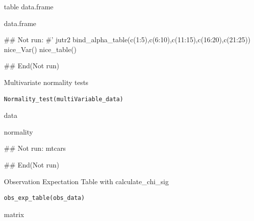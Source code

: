 \documentclass[a4paper]{book}
\begin{document}
%
\begin{Value}
table data.frame

data.frame
\end{Value}
%
\begin{Examples}
\begin{ExampleCode}

\#\# Not run: 
#'
jutr2 %
  bind_alpha_table(c(1:5),c(6:10),c(11:15),c(16:20),c(21:25))%
  nice_Var()%
  nice_table()

## End(Not run)
\end{ExampleCode}
\end{Examples}
%
\begin{Description}
Multivariate normality tests
\end{Description}
%
\begin{Usage}
\begin{verbatim}
Normality_test(multiVariable_data)
\end{verbatim}
\end{Usage}
%
\begin{Arguments}
\begin{ldescription}
\item[\code{multiVariable\_data}] data
\end{ldescription}
\end{Arguments}
%
\begin{Value}
normality
\end{Value}
%
\begin{Examples}
\begin{ExampleCode}

\#\# Not run: 
mtcars%

## End(Not run)

\end{ExampleCode}
\end{Examples}
%
\begin{Description}
Observation Expectation Table with calculate\_chi\_sig
\end{Description}
%
\begin{Usage}
\begin{verbatim}
obs_exp_table(obs_data)
\end{verbatim}
\end{Usage}
%
\begin{Arguments}
\begin{ldescription}
\item[\code{obs\_data}] matrix
\end{ldescription}
\end{Arguments}
\end{document}
